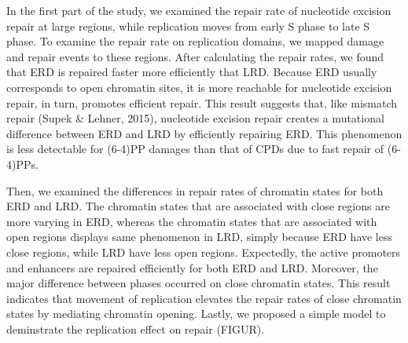 In the first part of the study, we examined the repair rate of nucleotide excision repair at large regions, while replication moves from early S phase to late S phase. To examine the repair rate on replication domains, we mapped damage and repair events to these regions. After calculating the repair rates, we found that ERD is repaired faster more efficiently that LRD. Because ERD usually corresponds to open chromatin sites, it is more reachable for nucleotide excision repair, in turn, promotes efficient repair. This result suggests that, like mismatch repair (Supek \& Lehner, 2015), nucleotide excision repair creates a mutational difference between ERD and LRD by efficiently repairing ERD. This phenomenon is less detectable for (6-4)PP damages than that of CPDs due to fast repair of (6-4)PPs.

Then, we examined the differences in repair rates of chromatin states for both ERD and LRD. The chromatin states that are associated with close regions are more varying in ERD, whereas the chromatin states that are associated with open regions displays same phenomenon in LRD, simply because ERD have less close regions, while LRD have less open regions. Expectedly, the active promoters and enhancers are repaired efficiently for both ERD and LRD. Moreover, the major difference between phases occurred on close chromatin states. This result indicates that movement of replication elevates the repair rates of close chromatin states by mediating chromatin opening. Lastly, we proposed a simple model to deminstrate the replication effect on repair (FIGUR).     

